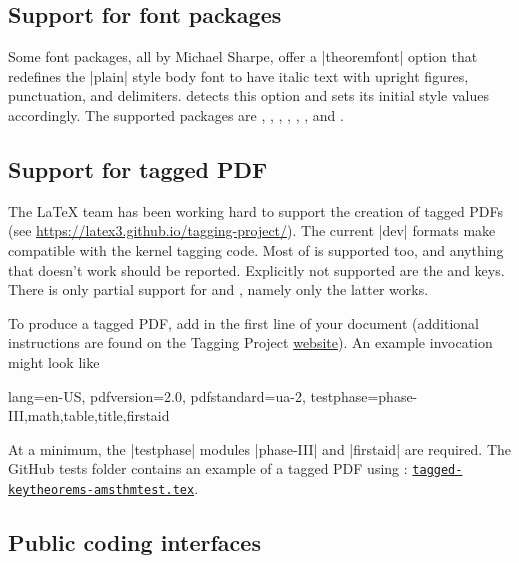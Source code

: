 \documentclass{ltxdoc}
\begin{document}
\subsection{Support for font packages}

Some font packages, all by Michael Sharpe, offer a |theoremfont| option that redefines the |plain| style body font to have italic text with upright figures, punctuation, and delimiters.  detects this option and sets its initial style values accordingly. The supported packages are , , , , , , and .

\subsection{Support for tagged PDF}

The \LaTeX{} team has been working hard to support the creation of tagged PDFs (see \url{https://latex3.github.io/tagging-project/}).
The current |dev| formats make  compatible with the kernel tagging code.
Most of  is supported too, and anything that doesn't work should be reported.
Explicitly not supported are the  and  keys.
There is only partial support for  and , namely only the latter works.

To produce a tagged PDF, add  in the first line of your document (additional instructions are found on the Tagging Project \href{https://latex3.github.io/tagging-project/documentation/prototype-usage-instructions.html}{website}).
An example invocation might look like

\begin{dispListing}
\DocumentMetadata
  {
    lang=en-US,
    pdfversion=2.0,
    pdfstandard=ua-2,
    testphase={phase-III,math,table,title,firstaid}
  }
\end{dispListing}

At a minimum, the |testphase| modules |phase-III| and |firstaid| are required.
The GitHub tests folder contains an example of a tagged PDF using : \href{https://github.com/mbertucci47/keytheorems/blob/main/tests/tagged-keytheorems-amsthmtest.tex}{\texttt{tagged-keytheorems-amsthmtest.tex}}.

\subsection{Public coding interfaces}
\end{document}

